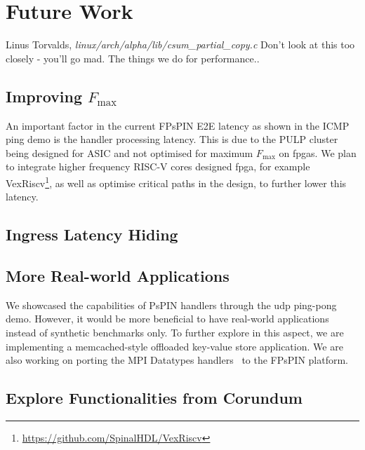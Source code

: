 \chapter{Future Work}
\begin{chapquote}{Linus Torvalds, \emph{linux/arch/alpha/lib/csum\_partial\_copy.c}}
Don't look at this too closely - you'll go mad.  The things we do for performance..
\end{chapquote}

\section{Improving $F_{\text{max}}$} \label{sec:improving-fmax}

An important factor in the current FPsPIN E2E latency as shown in the ICMP ping demo is the handler processing latency.  This is due to the PULP cluster being designed for ASIC and not optimised for maximum $F_{\text{max}}$ on \ac{fpga}s.  We plan to integrate higher frequency RISC-V cores designed \ac{fpga}, for example VexRiscv\footnote{\url{https://github.com/SpinalHDL/VexRiscv}}, as well as optimise critical paths in the design, to further lower this latency.



\section{Ingress Latency Hiding} \label{sec:ingress-latency-hiding}

\section{More Real-world Applications}

We showcased the capabilities of PsPIN handlers through the \ac{udp} ping-pong demo.  However, it would be more beneficial to have real-world applications instead of synthetic benchmarks only.  To further explore in this aspect, we are implementing a memcached-style offloaded key-value store application.  We are also working on porting the MPI Datatypes handlers~\cite{di_girolamo_network-accelerated_2019} to the FPsPIN platform.

\section{Explore Functionalities from Corundum}
